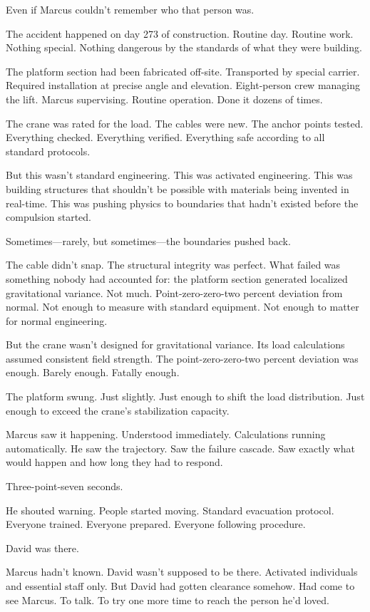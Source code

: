Even if Marcus couldn't remember who that person was.

\scenebreak

The accident happened on day 273 of construction. Routine day. Routine work. Nothing special. Nothing dangerous by the standards of what they were building.

The platform section had been fabricated off-site. Transported by special carrier. Required installation at precise angle and elevation. Eight-person crew managing the lift. Marcus supervising. Routine operation. Done it dozens of times.

The crane was rated for the load. The cables were new. The anchor points tested. Everything checked. Everything verified. Everything safe according to all standard protocols.

But this wasn't standard engineering. This was activated engineering. This was building structures that shouldn't be possible with materials being invented in real-time. This was pushing physics to boundaries that hadn't existed before the compulsion started.

Sometimes—rarely, but sometimes—the boundaries pushed back.

The cable didn't snap. The structural integrity was perfect. What failed was something nobody had accounted for: the platform section generated localized gravitational variance. Not much. Point-zero-zero-two percent deviation from normal. Not enough to measure with standard equipment. Not enough to matter for normal engineering.

But the crane wasn't designed for gravitational variance. Its load calculations assumed consistent field strength. The point-zero-zero-two percent deviation was enough. Barely enough. Fatally enough.

The platform swung. Just slightly. Just enough to shift the load distribution. Just enough to exceed the crane's stabilization capacity.

Marcus saw it happening. Understood immediately. Calculations running automatically. He saw the trajectory. Saw the failure cascade. Saw exactly what would happen and how long they had to respond.

Three-point-seven seconds.

He shouted warning. People started moving. Standard evacuation protocol. Everyone trained. Everyone prepared. Everyone following procedure.

David was there.

Marcus hadn't known. David wasn't supposed to be there. Activated individuals and essential staff only. But David had gotten clearance somehow. Had come to see Marcus. To talk. To try one more time to reach the person he'd loved.

